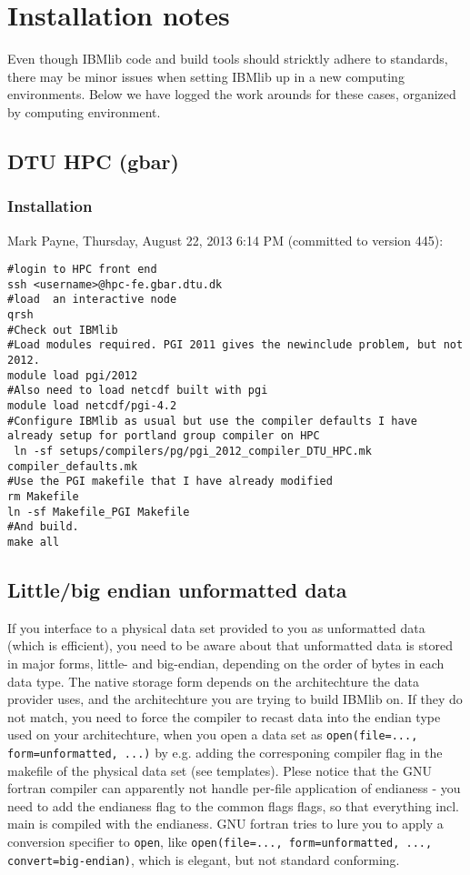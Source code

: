 \chapter{Installation notes}

Even though IBMlib code and build tools should stricktly adhere to standards, there may be
minor issues when setting IBMlib up in a new computing environments. Below we have logged the work arounds
for these cases, organized by computing environment.

\section{DTU HPC (gbar)}

\subsection{Installation}
Mark Payne, Thursday, August 22, 2013 6:14 PM (committed to version 445):
\begin{verbatim}
#login to HPC front end
ssh <username>@hpc-fe.gbar.dtu.dk
#load  an interactive node
qrsh
#Check out IBMlib
#Load modules required. PGI 2011 gives the newinclude problem, but not 2012.
module load pgi/2012
#Also need to load netcdf built with pgi
module load netcdf/pgi-4.2
#Configure IBMlib as usual but use the compiler defaults I have already setup for portland group compiler on HPC
 ln -sf setups/compilers/pg/pgi_2012_compiler_DTU_HPC.mk compiler_defaults.mk
#Use the PGI makefile that I have already modified
rm Makefile
ln -sf Makefile_PGI Makefile
#And build.
make all
\end{verbatim}

\section{Little/big endian unformatted data}
If you interface to a physical data set provided to you as unformatted data (which is efficient), you need to be aware about that
unformatted data is stored in major forms, little- and big-endian, depending on the order of bytes in each data type. The native 
storage form depends on the architechture the data provider uses, and the architechture you are trying to build IBMlib on.
If they do not match, you need to force the compiler to recast data into the endian type used on your architechture, when you
open a data set as {\tt open(file=..., form=unformatted, ...)} by e.g. adding the corresponing compiler flag in the makefile
of the physical data set (see templates). Plese notice that the GNU fortran compiler can apparently not handle per-file
application of endianess - you need to add the endianess flag to the common flags flags, so that everything incl. main is
compiled with the endianess. GNU fortran tries to lure you to apply a conversion specifier to {\tt open}, like
{\tt open(file=..., form=unformatted, ..., convert=big-endian)}, which is elegant, but not standard conforming.

